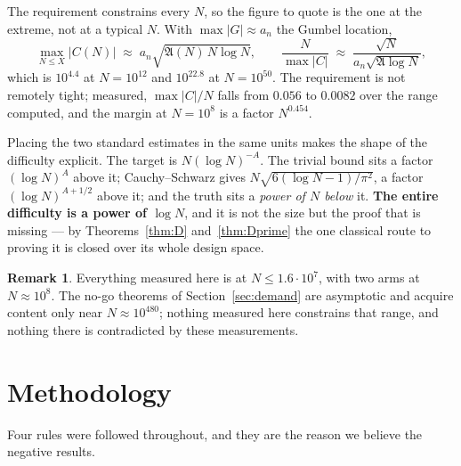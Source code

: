\documentclass[11pt,a4paper]{article}
\theoremstyle{plain}
\theoremstyle{definition}
\newtheorem{remark}[theorem]{Remark}
\newcommand{\AAA}{\mathfrak{A}}
\begin{document}
The requirement constrains every $N$, so the figure to quote is the one
at the extreme, not at a typical $N$. With $\max|G|\approx a_n$ the
Gumbel location,
\[
  \max_{N\le X}|C(N)| \;\approx\; a_n\sqrt{\AAA(N)\,N\log N},
  \qquad
  \frac{N}{\max|C|}\;\approx\;
  \frac{\sqrt N}{a_n\sqrt{\AAA\log N}},
\]
which is $10^{4.4}$ at $N=10^{12}$ and $10^{22.8}$ at $N=10^{50}$. The
requirement is not remotely tight; measured, $\max|C|/N$ falls from
$0.056$ to $0.0082$ over the range computed, and the margin at
$N=10^8$ is a factor $N^{0.454}$.

Placing the two standard estimates in the same units makes the shape of
the difficulty explicit. The target is $N(\log N)^{-A}$. The trivial
bound sits a factor $(\log N)^{A}$ above it; Cauchy--Schwarz gives
$N\sqrt{6(\log N-1)/\pi^2}$, a factor $(\log N)^{A+1/2}$ above it; and
the truth sits a \emph{power of $N$ below} it. \textbf{The entire
difficulty is a power of $\log N$}, and it is not the size but the
proof that is missing --- by Theorems~\ref{thm:D} and~\ref{thm:Dprime}
the one classical route to proving it is closed over its whole design
space.

\begin{remark}
Everything measured here is at $N\le1.6\cdot10^7$, with two arms at
$N\approx10^8$. The no-go theorems of Section~\ref{sec:demand} are
asymptotic and acquire content only near $N\approx10^{480}$; nothing
measured here constrains that range, and nothing there is contradicted
by these measurements.
\end{remark}

\section{Methodology}

Four rules were followed throughout, and they are the reason we believe
the negative results.
\end{document}
